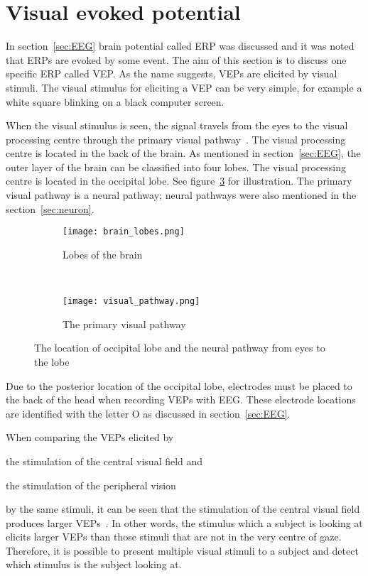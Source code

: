 \section{Visual evoked potential}
\label{sec:VEP}

In section~\ref{sec:EEG} brain potential called \gls{ERP} was discussed and it was noted that \glspl{ERP} are evoked by some event. The aim of this section is to discuss one specific \gls{ERP} called \gls{VEP}. As the name suggests, \glspl{VEP} are elicited by visual stimuli. The visual stimulus for eliciting a \gls{VEP} can be very simple, for example a white square blinking on a black computer screen.

When the visual stimulus is seen, the signal travels from the eyes to the \gls{visual processing centre} through the \gls{primary visual pathway}~\cite{neuroscience}. The \gls{visual processing centre} is located in the back of the brain. As mentioned in section~\ref{sec:EEG}, the outer layer of the brain can be classified into four lobes. The \gls{visual processing centre} is located in the occipital lobe. See figure~\ref{fig:lobes_pathway} for illustration. The \gls{primary visual pathway} is a \gls{neural pathway}; \glspl{neural pathway} were also mentioned in the section~\ref{sec:neuron}.

\begin{figure}[h]
	\centering
	\begin{subfigure}{0.48\textwidth}
		\texttt{[image: brain\_lobes.png]}
		\caption{Lobes of the brain~\cite{blausen}}
		\label{fig:brain_lobes}
	\end{subfigure}
	~
	\begin{subfigure}{0.48\textwidth}
		\texttt{[image: visual\_pathway.png]}
		\caption{The primary visual pathway~\cite[p.~261]{neuroscience}}
		\label{fig:visual_pathway}
	\end{subfigure}
	\caption{The location of occipital lobe and the neural pathway from eyes to the lobe}
	\label{fig:lobes_pathway}
\end{figure}

Due to the posterior location of the occipital lobe, electrodes must be placed to the back of the head when recording \glspl{VEP} with \gls{EEG}. These electrode locations are identified with the letter O as discussed in section~\ref{sec:EEG}.

When comparing the \glspl{VEP} elicited by
\begin{enumerate*}[(1)]
	\item the stimulation of the \gls{central visual field} and
	\item the stimulation of the \gls{peripheral vision}
\end{enumerate*} by the same stimuli, it can be seen that the stimulation of the \gls{central visual field} produces larger \glspl{VEP}~\cite{VEP_size}. In other words, the stimulus which a subject is looking at elicits larger \glspl{VEP} than those stimuli that are not in the very centre of gaze. Therefore, it is possible to present multiple visual stimuli to a subject and detect which stimulus is the subject looking at. 

